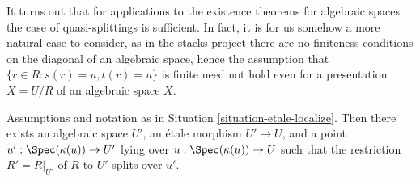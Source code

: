 \noindent
It turns out that for applications to the existence theorems for algebraic
spaces the case of quasi-splittings is sufficient. In fact, it is for us
somehow a more natural case to consider, as in the stacks project there
are no finiteness conditions on the diagonal of an algebraic space, hence
the assumption that $\{r \in R : s(r) = u, t(r) = u\}$ is finite need
not hold even for a presentation $X = U/R$ of an algebraic space $X$.

\begin{lemma}
\label{lemma-splitting-general}
Assumptions and notation as in
Situation \ref{situation-etale-localize}.
Then there exists an algebraic space $U'$, an \'etale morphism
$U' \to U$, and a point $u' : \Spec(\kappa(u)) \to U'$
lying over $u : \Spec(\kappa(u)) \to U$
such that the restriction $R' = R|_{U'}$ of $R$ to $U'$
splits over $u'$.
\end{lemma}

